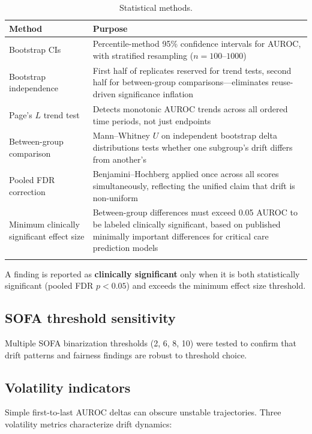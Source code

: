 \documentclass[pdflatex,sn-mathphys-num]{sn-jnl}
\theoremstyle{thmstyleone}%
\theoremstyle{thmstyletwo}%
\theoremstyle{thmstylethree}%
\begin{document}
\begin{table}[htbp]
\caption{Statistical methods.}\label{tab:methods}
\begin{tabular*}{\textwidth}{@{\extracolsep\fill}lp{10cm}}
\toprule
Method & Purpose \\
\midrule
Bootstrap CIs & Percentile-method 95\% confidence intervals for AUROC, with stratified resampling ($n = 100$--$1000$) \\
Bootstrap independence & First half of replicates reserved for trend tests, second half for between-group comparisons---eliminates reuse-driven significance inflation \\
Page's $L$ trend test & Detects monotonic AUROC trends across all ordered time periods, not just endpoints \\
Between-group comparison & Mann--Whitney $U$ on independent bootstrap delta distributions tests whether one subgroup's drift differs from another's \\
Pooled FDR correction & Benjamini--Hochberg applied once across all scores simultaneously, reflecting the unified claim that drift is non-uniform \\
Minimum clinically significant effect size & Between-group differences must exceed 0.05 AUROC to be labeled clinically significant, based on published minimally important differences for critical care prediction models \\
\botrule
\end{tabular*}
\end{table}

A finding is reported as \textbf{clinically significant} only when it is both statistically significant (pooled FDR $p < 0.05$) and exceeds the minimum effect size threshold.

\subsection{SOFA threshold sensitivity}\label{subsec:sofa_threshold}

Multiple SOFA binarization thresholds (2, 6, 8, 10) were tested to confirm that drift patterns and fairness findings are robust to threshold choice.

\subsection{Volatility indicators}\label{subsec:volatility}

Simple first-to-last AUROC deltas can obscure unstable trajectories. Three volatility metrics characterize drift dynamics:
\end{document}
